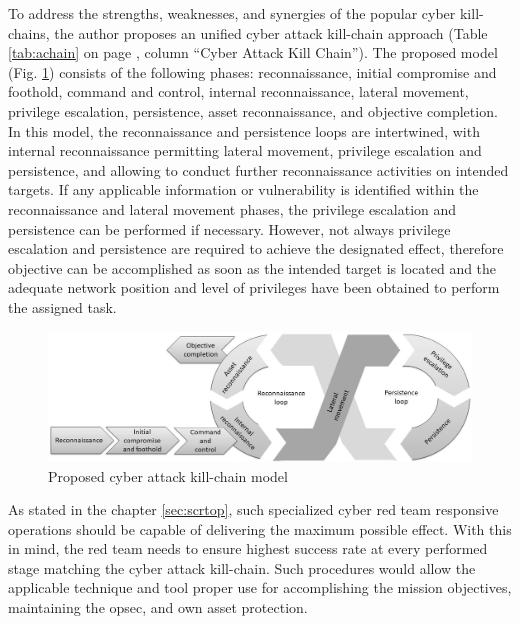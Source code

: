 To address the strengths, weaknesses, and synergies of the popular cyber kill-chains, the author proposes an unified cyber attack kill-chain approach (Table \ref{tab:achain} on page \pageref{tab:achain}, column ``Cyber Attack Kill Chain''). The proposed model (Fig. \ref{fig:cakchain}) consists of the following phases: reconnaissance, initial compromise and foothold, command and control, internal reconnaissance, lateral movement, privilege escalation, persistence, asset reconnaissance, and objective completion. In this model, the reconnaissance and persistence loops are intertwined, with internal reconnaissance permitting lateral movement, privilege escalation and persistence, and allowing to conduct further reconnaissance activities on intended targets. If any applicable information or vulnerability is identified within the reconnaissance and lateral movement phases, the privilege escalation and persistence can be performed if necessary. However, not always privilege escalation and persistence are required to achieve the designated effect, therefore objective can be accomplished as soon as the intended target is located and the adequate network position and level of privileges have been obtained to perform the assigned task.

\begin{figure}[!htb]
    \centering
    \includegraphics[width=1.0\textwidth]{./img/cyber-attack-kill-chain.jpg}
    \caption{Proposed cyber attack kill-chain model}
    \label{fig:cakchain}
\end{figure}

As stated in the chapter \ref{sec:scrtop}, such specialized cyber red team responsive operations should be capable of delivering the maximum possible effect. With this in mind, the red team needs to ensure highest success rate at every performed stage matching the cyber attack kill-chain. Such procedures would allow the applicable technique and tool proper use for accomplishing the mission objectives, maintaining the \gls{opsec}, and own asset protection.


